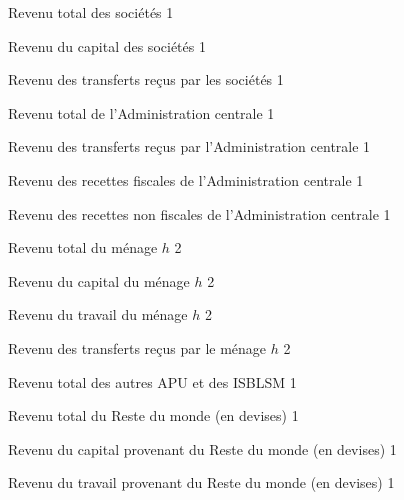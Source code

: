 \documentclass[11pt,a4paper]{article}
\newcommand{\YFTR}{\mathit{YFTRA}}
\newcommand{\YH}{\mathit{YH}}
\newcommand{\YHK}{\mathit{YHK}}
\newcommand{\YHL}{\mathit{YHL}}
\newcommand{\YHTR}{\mathit{YHTRA}}
\newcommand{\YF}{\mathit{YF}}
\newcommand{\YFK}{\mathit{YFK}}
\newcommand{\YG}{\mathit{YG}}
\newcommand{\YGTX}{\mathit{YGTX}}
\newcommand{\YGNTX}{\mathit{YGNTX}}
\newcommand{\YGTR}{\mathit{YGTRA}}
\newcommand{\YNG}{\mathit{YNG}}
\newcommand{\YROW}{\mathit{YROW}}
\newcommand{\YROWK}{\mathit{YROWK}}
\newcommand{\YROWL}{\mathit{YROWL}}
\begin{document}
\begin{description}[leftmargin=!,labelwidth=\widthof{\bfseries AAAAAAAA},parsep=10pt]
		\item[$\YF$]	Revenu total des sociétés 			\hfill 1
		\item[$\YFK$]	Revenu du capital des sociétés 		\hfill 1%
		\item[$\YFTR$]	Revenu des transferts reçus par les sociétés 	\hfill 1
		\item[$\YG$]	Revenu total de l'Administration centrale 		\hfill 1%
		\item[$\YGTR$]	Revenu des transferts reçus par l'Administration centrale 	\hfill 1
		\item[$\YGTX$]	Revenu des recettes fiscales de l'Administration centrale 	\hfill 1%
		\item[$\YGNTX$]	Revenu des recettes non fiscales de l'Administration centrale 	\hfill 1%
		\item[$\YH_h$]	Revenu total du ménage $h$ 			\hfill 2
		\item[$\YHK_h$]	Revenu du capital du ménage $h$ 	\hfill 2
		\item[$\YHL_h$]	Revenu du travail du ménage $h$ 	\hfill 2%
		\item[$\YHTR_h$]Revenu des transferts reçus par le ménage $h$ 	\hfill 2
		\item[$\YNG$]	Revenu total des autres APU et des ISBLSM		\hfill 1
		\item[$\YROW$]	Revenu total du Reste du monde	(en devises)				\hfill 1
		\item[$\YROWK$]	Revenu du capital provenant du Reste du monde (en devises)	\hfill 1
		\item[$\YROWL$]	Revenu du travail provenant du Reste du monde (en devises)	\hfill 1%
		
	\end{description}
	
\end{document}
